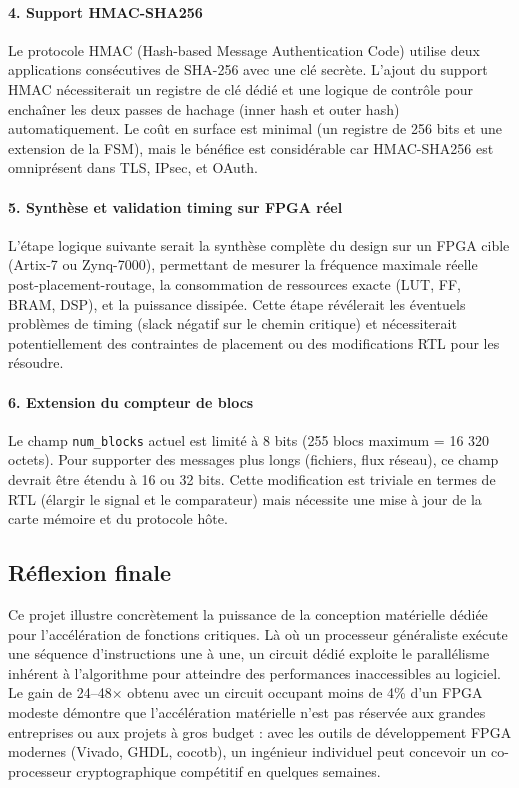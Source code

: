 \paragraph{4. Support HMAC-SHA256} Le protocole HMAC (Hash-based Message Authentication Code) utilise deux applications consécutives de SHA-256 avec une clé secrète. L'ajout du support HMAC nécessiterait un registre de clé dédié et une logique de contrôle pour enchaîner les deux passes de hachage (inner hash et outer hash) automatiquement. Le coût en surface est minimal (un registre de 256 bits et une extension de la FSM), mais le bénéfice est considérable car HMAC-SHA256 est omniprésent dans TLS, IPsec, et OAuth.

\paragraph{5. Synthèse et validation timing sur FPGA réel} L'étape logique suivante serait la synthèse complète du design sur un FPGA cible (Artix-7 ou Zynq-7000), permettant de mesurer la fréquence maximale réelle post-placement-routage, la consommation de ressources exacte (LUT, FF, BRAM, DSP), et la puissance dissipée. Cette étape révélerait les éventuels problèmes de timing (slack négatif sur le chemin critique) et nécessiterait potentiellement des contraintes de placement ou des modifications RTL pour les résoudre.

\paragraph{6. Extension du compteur de blocs} Le champ \texttt{num\_blocks} actuel est limité à 8 bits (255 blocs maximum = 16 320 octets). Pour supporter des messages plus longs (fichiers, flux réseau), ce champ devrait être étendu à 16 ou 32 bits. Cette modification est triviale en termes de RTL (élargir le signal et le comparateur) mais nécessite une mise à jour de la carte mémoire et du protocole hôte.

\subsection{Réflexion finale}

Ce projet illustre concrètement la puissance de la conception matérielle dédiée pour l'accélération de fonctions critiques. Là où un processeur généraliste exécute une séquence d'instructions une à une, un circuit dédié exploite le parallélisme inhérent à l'algorithme pour atteindre des performances inaccessibles au logiciel. Le gain de 24--48$\times$ obtenu avec un circuit occupant moins de 4\% d'un FPGA modeste démontre que l'accélération matérielle n'est pas réservée aux grandes entreprises ou aux projets à gros budget : avec les outils de développement FPGA modernes (Vivado, GHDL, cocotb), un ingénieur individuel peut concevoir un co-processeur cryptographique compétitif en quelques semaines.

